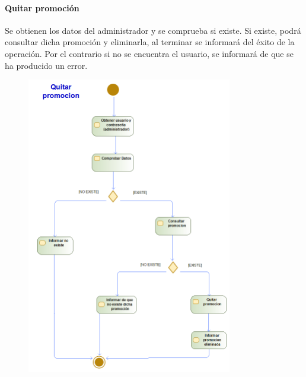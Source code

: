 \paragraph{Quitar promoción}
Se obtienen los datos del administrador y se comprueba si existe. Si existe, podrá consultar dicha promoción y eliminarla, al terminar se informará del éxito de la operación. Por el contrario si no se encuentra el usuario, se informará de que se ha producido un error.
\begin{figure}[H]
    \centering
    \includegraphics[width=0.8\textwidth]{Use_Cases/quitar_promocion.png}
\end{figure}
\newpage
